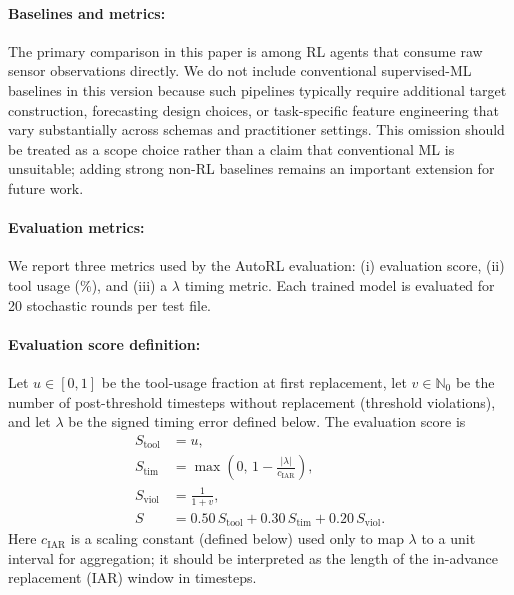 \documentclass[sn-basic]{sn-jnl} %
\begin{document}
\paragraph{Baselines and metrics:}
\label{sec:metrics}
The primary comparison in this paper is among RL agents that consume raw sensor observations directly. We do not include conventional supervised-ML baselines in this version because such pipelines typically require additional target construction, forecasting design choices, or task-specific feature engineering that vary substantially across schemas and practitioner settings. This omission should be treated as a scope choice rather than a claim that conventional ML is unsuitable; adding strong non-RL baselines remains an important extension for future work.

\paragraph{Evaluation metrics:}
We report three metrics used by the AutoRL evaluation: (i) evaluation score, (ii) tool usage (\%), and (iii) a $\lambda$ timing metric. Each trained model is evaluated for 20 stochastic rounds per test file.

\paragraph{Evaluation score definition:}
Let $u\in[0,1]$ be the tool-usage fraction at first replacement, let $v\in\mathbb{N}_0$ be the number of post-threshold timesteps without replacement (threshold violations), and let $\lambda$ be the signed timing error defined below. The evaluation score is
\begin{align}
S_{\text{tool}} &= u,\\
S_{\text{tim}} &= \max\left(0,\,1-\frac{|\lambda|}{c_{\mathrm{IAR}}}\right),\\
S_{\text{viol}} &= \frac{1}{1+v},\\
S &= 0.50\,S_{\text{tool}} + 0.30\,S_{\text{tim}} + 0.20\,S_{\text{viol}}.
\end{align}
Here $c_{\mathrm{IAR}}$ is a scaling constant (defined below) used only to map $\lambda$ to a unit interval for aggregation; it should be interpreted as the length of the in-advance replacement (IAR) window in timesteps.

\end{document}
